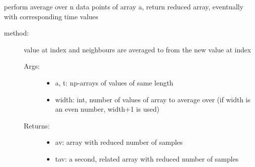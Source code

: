 \documentclass[letterpaper,10pt,english]{sphinxmanual}
\begin{document}
\begin{fulllineitems}
\label{\detokenize{index:PhyPraKit.PhyPraKit.resample}}
perform average over n data points of array a, 
return reduced array, eventually with corresponding time values
\begin{description}
\item[{method:}] \leavevmode
value at index  and  neighbours are averaged
to from the new value at index 
\begin{description}
\item[{Args:}] \leavevmode\begin{itemize}
\item {} 
a, t: np-arrays of values of same length

\item {} 
width: int, number of values of array  to average over
(if width is an even number, width+1 is used)

\end{itemize}

\item[{Returns:}] \leavevmode\begin{itemize}
\item {} 
av: array with reduced number of samples

\item {} 
tav:  a second, related array with reduced number of samples

\end{itemize}

\end{description}

\end{description}

\end{fulllineitems}

\end{document}
